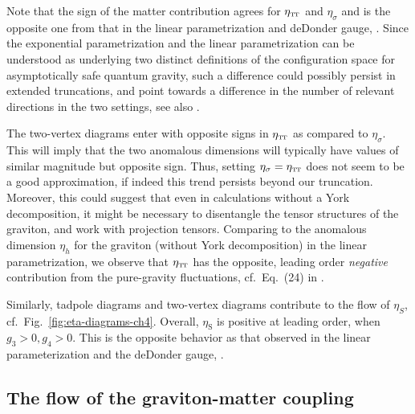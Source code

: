 \documentclass[11pt]{book} %
\newcommand\TTspace{ -1pt }
\newcommand\etaTT{ \eta_{\scriptscriptstyle{\mathrm{T\hspace{\TTspace}T}}} }
\newcommand\etaS{ \eta_{\scriptscriptstyle{\mathrm{S}}} }
\newcommand{\bea}{\begin{eqnarray}}
\newcommand{\eea}{\end{eqnarray}}
\numberwithin{equation}{chapter}
\begin{document}
Note that the sign of the matter contribution agrees for $\etaTT$ and $\eta_\sigma$
and is the opposite one from that in the linear parametrization and deDonder gauge,
\cite{Dona:2013qba}. Since the exponential parametrization and the linear parametrization
can be understood as underlying two distinct definitions of the configuration space for
asymptotically safe quantum gravity, such a difference could possibly persist in extended truncations,
and point towards a difference in the number of relevant directions in the two settings,
see also \cite{Ohta:2015efa}.

The two-vertex diagrams enter with opposite signs in $\etaTT$ as compared to $\eta_\sigma$.
This will imply that the two anomalous dimensions will typically have values of similar magnitude
but opposite sign. Thus, setting $\eta_\sigma = \etaTT$ does not seem to be a good approximation,
if indeed this trend persists beyond our truncation.
Moreover, this could suggest that even in calculations without a York decomposition,
it might be necessary to disentangle the tensor structures of the graviton,
and work with projection tensors.
Comparing to the anomalous dimension $\eta_h$ for the graviton (without York decomposition)
in the linear parametrization,
we observe that $\etaTT$ has the opposite,
leading order \emph{negative} contribution from the pure-gravity fluctuations,
cf.~Eq.~(24) in \cite{Dona:2013qba}.

Similarly, tadpole diagrams and two-vertex diagrams contribute to the flow of $\eta_S$,
cf.~Fig.~\ref{fig:eta-diagrams-ch4}.
Overall, $\etaS$ is positive at leading order, when $g_3>0, g_4>0$.
This is the opposite behavior as that observed in the linear parameterization
and the deDonder gauge, \cite{Dona:2013qba}.


\subsection{The flow of the graviton-matter coupling}
\end{document}
